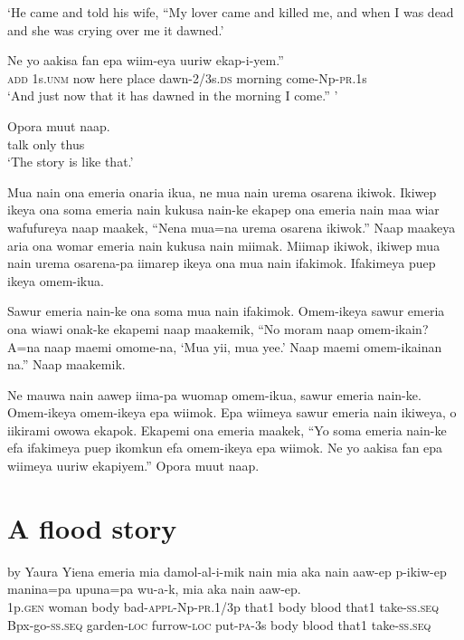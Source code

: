 \glt ‘He came and told his wife, “My lover came and killed me, and when I was dead and she was crying over me it dawned.’ \\
\z


\ea
\gll  Ne  yo  aakisa  fan  epa  wiim-eya  uuriw  ekap-i-yem.” \\
\textsc{add}  1s.\textsc{unm}  now  here  place  dawn-2/3s.\textsc{ds}  morning  come-Np-\textsc{pr}.1s \\
\glt ‘And just now that it has dawned in the morning I come.” ’ \\
\z


\ea
\gll  Opora  muut  naap. \\
talk  only  thus \\
\glt ‘The story is like that.’ \\
\z

Mua nain ona emeria onaria ikua, ne mua nain urema osarena ikiwok. 
\textrm{Ikiwep ikeya ona soma emeria nain kukusa nain-ke ekapep ona emeria nain maa wiar wafufureya naap maakek, “Nena mua=na urema osarena ikiwok.”  }
Naap maakeya aria ona womar emeria nain kukusa nain miimak. 
Miimap ikiwok, ikiwep mua nain urema osarena-pa iimarep ikeya ona mua nain ifakimok. 
Ifakimeya puep ikeya omem-ikua. 

Sawur emeria nain-ke ona soma mua nain ifakimok. 
\textrm{Omem-ikeya sawur emeria ona wiawi onak-ke ekapemi naap maakemik, “No moram naap omem-ikain?  }
\textrm{A=na naap maemi omome-na, ‘Mua yii, mua yee.’ }
\textrm{Naap maemi omem-ikainan na.”  }
Naap maakemik.

Ne mauwa nain aawep iima-pa wuomap omem-ikua, sawur emeria nain-ke. 
Omem-ikeya omem-ikeya epa wiimok. 
Epa wiimeya sawur emeria nain ikiweya, o iikirami owowa ekapok. 
\textrm{Ekapemi ona emeria maakek, “Yo soma emeria nain-ke efa ifakimeya puep ikomkun efa omem-ikeya epa wiimok.  }
\textrm{Ne yo aakisa fan epa wiimeya uuriw ekapiyem.”  }
Opora muut naap.

 
\section{A flood story}\label{app:2:flood}
by Yaura
\ea
\gll  Yiena  emeria  mia  damol-al-i-mik  nain  mia  aka  nain      aaw-ep  p-ikiw-ep  manina=pa  upuna=pa  wu-a-k,               mia  aka  nain  aaw-ep. \\
1p.\textsc{gen}  woman  body  bad-\textsc{appl}-Np-\textsc{pr}.1/3p  that1  body  blood  that1 take-\textsc{ss.seq}  Bpx-go-\textsc{ss.seq}  garden-\textsc{loc}  furrow-\textsc{loc}  put-\textsc{pa}-3s body  blood  that1  take-\textsc{ss.seq} \\




